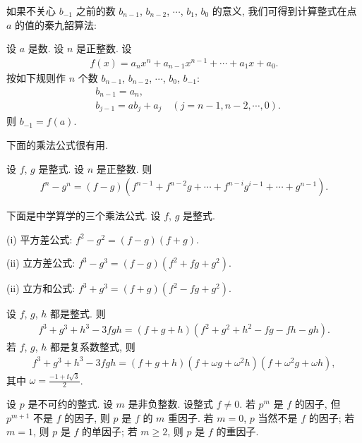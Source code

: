 如果不关心 $b_{-1}$ 之前的数 $b_{n-1}$, $b_{n-2}$, $\cdots$, $b_1$, $b_0$ 的意义, 我们可得到计算整式在点 $a$ 的值的秦九韶算法:
\begin{proposition}
    设 $a$ 是数. 设 $n$ 是正整数. 设
    \begin{align*}
        f(x) = a_n x^n + a_{n-1} x^{n-1} + \cdots + a_1 x + a_0.
    \end{align*}
    按如下规则作 $n$ 个数 $b_{n-1}$, $b_{n-2}$, $\cdots$, $b_0$, $b_{-1}$:
    \begin{align*}
         & b_{n-1} = a_n,                                     \\
         & b_{j-1} = ab_j + a_j \quad (j = n-1,n-2,\cdots,0).
    \end{align*}
    则 $b_{-1} = f(a)$.
\end{proposition}

下面的乘法公式很有用.
\begin{proposition}
    设 $f$, $g$ 是整式. 设 $n$ 是正整数. 则
    \begin{align*}
        f^n - g^n = (f - g)(f^{n-1} + f^{n-2} g + \cdots + f^{n-i} g^{i-1} + \cdots + g^{n-1}).
    \end{align*}
\end{proposition}

\begin{proposition}
    下面是中学算学的三个乘法公式. 设 $f$, $g$ 是整式.

    (i) 平方差公式: $f^2 - g^2 = (f - g)(f + g)$.

    (ii) 立方差公式: $f^3 - g^3 = (f - g)(f^2 + fg + g^2)$.

    (ii) 立方和公式: $f^3 + g^3 = (f + g)(f^2 - fg + g^2)$.
\end{proposition}

\begin{proposition}
    设 $f$, $g$, $h$ 都是整式. 则
    \begin{align*}
        f^3 + g^3 + h^3 - 3fgh = (f + g + h)(f^2 + g^2 + h^2 - fg - fh - gh).
    \end{align*}
    若 $f$, $g$, $h$ 都是复系数整式, 则
    \begin{align*}
        f^3 + g^3 + h^3 - 3fgh = (f + g + h) (f + \omega g + \omega^2 h) (f + \omega^2 g + \omega h),
    \end{align*}
    其中 $\omega = \frac{-1 + \ii \sqrt{3}}{2}$.
\end{proposition}

\begin{definition}
    设 $p$ 是不可约的整式. 设 $m$ 是非负整数. 设整式 $f \neq 0$. 若 $p^m$ 是 $f$ 的因子, 但 $p^{m+1}$ 不是 $f$ 的因子, 则 $p$ 是 $f$ 的 $m$ 重因子. 若 $m = 0$, $p$ 当然不是 $f$ 的因子; 若 $m = 1$, 则 $p$ 是 $f$ 的单因子; 若 $m \geq 2$, 则 $p$ 是 $f$ 的重因子.
\end{definition}

